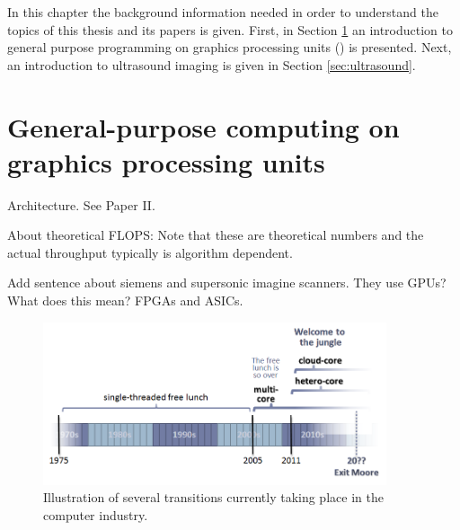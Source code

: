 %

In this chapter the background information needed in order to understand the topics of this thesis and its papers is given. First, in Section \ref{sec:gpgpu} an introduction to general purpose programming on graphics processing units () is presented. Next, an introduction to ultrasound imaging is given in Section \ref{sec:ultrasound}.

\section{General-purpose computing on graphics processing units}\label{sec:gpgpu}

Architecture. See Paper II.

About theoretical FLOPS: Note that these are theoretical numbers and the actual throughput typically is algorithm dependent.

Add sentence about siemens and supersonic imagine scanners. They use GPUs? What does this mean? FPGAs and ASICs.

\begin{figure}
\centering
\includegraphics[width=0.9\textwidth]{img/free_lunsh.png}
\caption{Illustration of several transitions currently taking place in the computer industry. }
\label{fig:jungle}
\end{figure}

